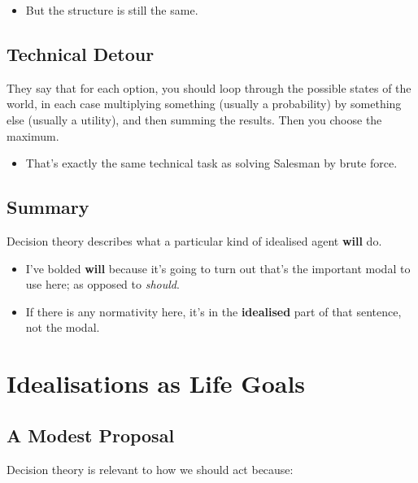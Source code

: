 \documentclass[
  11pt,
  letterpaper,
  DIV=11,
  numbers=noendperiod,
  oneside]{scrartcl}
\providecommand{\tightlist}{%
  \setlength{\itemsep}{0pt}\setlength{\parskip}{0pt}}\usepackage{longtable,booktabs,array}
\begin{document}
\begin{itemize}
\tightlist
\item
  But the structure is still the same.
\end{itemize}

\subsection{Technical Detour}\label{technical-detour-1}

They say that for each option, you should loop through the possible
states of the world, in each case multiplying something (usually a
probability) by something else (usually a utility), and then summing the
results. Then you choose the maximum.

\begin{itemize}
\tightlist
\item
  That's exactly the same technical task as solving Salesman by brute
  force.
\end{itemize}

\subsection{Summary}\label{summary}

Decision theory describes what a particular kind of idealised agent
\textbf{will} do.

\begin{itemize}
\tightlist
\item
  I've bolded \textbf{will} because it's going to turn out that's the
  important modal to use here; as opposed to \emph{should}.
\item
  If there is any normativity here, it's in the \textbf{idealised} part
  of that sentence, not the modal.
\end{itemize}

\section{Idealisations as Life Goals}\label{idealisations-as-life-goals}

\subsection{A Modest Proposal}\label{a-modest-proposal}

Decision theory is relevant to how we should act because:
\end{document}
